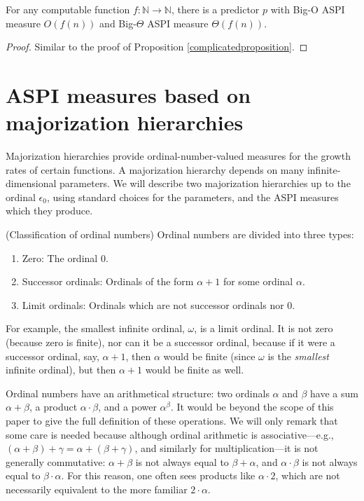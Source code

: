 \documentclass[twoside,11pt]{article}
\begin{document}
\begin{proposition}
    For any computable function $f:\mathbb N\to\mathbb N$, there is a predictor
    $p$ with Big-O ASPI measure $O(f(n))$ and Big-$\Theta$ ASPI measure
    $\Theta(f(n))$.
\end{proposition}

\begin{proof}
    Similar to the proof of Proposition \ref{complicatedproposition}.
\end{proof}


\section{ASPI measures based on majorization hierarchies}
\label{majorizationsection}

Majorization hierarchies \citep{weiermann2002slow}
provide ordinal-number-valued measures for the growth
rates of certain functions. A majorization hierarchy depends
on many infinite-dimensional parameters. We will describe two
majorization hierarchies up to the ordinal $\epsilon_0$,
using standard choices for the parameters, and the ASPI measures
which they produce.

\begin{definition}
    (Classification of ordinal numbers)
    Ordinal numbers are divided into three types:
    \begin{enumerate}
        \item Zero: The ordinal $0$.
        \item Successor ordinals: Ordinals of the form $\alpha+1$ for some ordinal $\alpha$.
        \item Limit ordinals: Ordinals which are not successor ordinals nor $0$.
    \end{enumerate}
\end{definition}

For example, the smallest infinite ordinal, $\omega$, is a limit ordinal. It is not zero
(because zero is finite),
nor can it be a successor ordinal, because if it were a successor ordinal, say, $\alpha+1$,
then $\alpha$ would be finite (since $\omega$ is the \emph{smallest} infinite ordinal),
but then $\alpha+1$ would be finite as well.

Ordinal numbers have an arithmetical structure: two ordinals $\alpha$ and $\beta$
have a sum $\alpha+\beta$, a product $\alpha\cdot \beta$, and a power
$\alpha^\beta$. It would be beyond the scope of this paper to give the full
definition of these operations. We will only remark that some care is needed because
although ordinal arithmetic is associative---e.g.,
$(\alpha+\beta)+\gamma=\alpha+(\beta+\gamma)$, and similarly for multiplication---it is
not generally commutative: $\alpha+\beta$ is not always equal to $\beta+\alpha$,
and $\alpha\cdot\beta$ is not always equal to $\beta\cdot\alpha$. For this reason,
one often sees products like $\alpha\cdot 2$, which are not necessarily equivalent to the
more familiar $2\cdot\alpha$.
\end{document}
